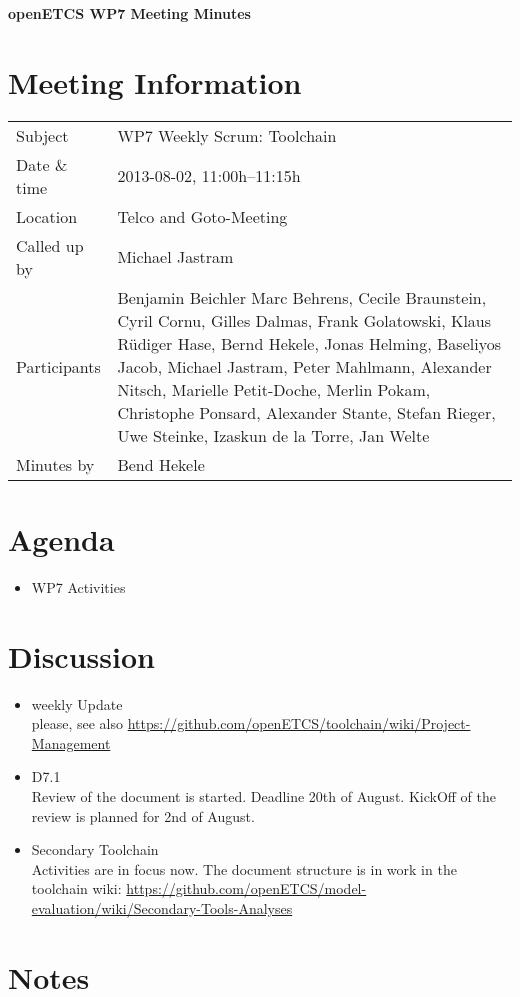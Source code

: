 \documentclass[a4paper, 11pt]{article}
\begin{document}
{\begin{center}\huge\bf openETCS WP7 Meeting Minutes\end{center}}
\section{Meeting Information}

\renewcommand{\arraystretch}{1.5}
\begin{supertabular}{m{.2\textwidth}m{.8\textwidth}}
Subject & WP7 Weekly Scrum: Toolchain\\
Date \& time & 2013-08-02, 11:00h--11:15h\\
Location & Telco and Goto-Meeting\\
Called up by & Michael Jastram\\
Participants &
Benjamin Beichler
Marc Behrens,
Cecile Braunstein,
Cyril Cornu,
Gilles Dalmas,
Frank Golatowski,
Klaus R\"udiger Hase,
Bernd Hekele,
Jonas Helming,
Baseliyos Jacob,
Michael Jastram,
Peter Mahlmann,
Alexander Nitsch,
Marielle Petit-Doche,
Merlin Pokam,
Christophe Ponsard,
Alexander Stante,
Stefan Rieger,
Uwe Steinke,
Izaskun de la Torre,
Jan Welte\\


Minutes by & Bend Hekele\\

\end{supertabular}
\renewcommand{\arraystretch}{1.0}


\section{Agenda}
\begin{itemize}
\item WP7 Activities
\end{itemize}

\section{Discussion}

\begin{itemize}
\item weekly Update\\
please, see also  \url{https://github.com/openETCS/toolchain/wiki/Project-Management}
\item D7.1\\
Review of the document is started. Deadline 20th of August. KickOff of the review is planned for 2nd of August.
\item Secondary Toolchain\\
Activities are in focus now. The document structure is in work in the toolchain wiki:
\url{https://github.com/openETCS/model-evaluation/wiki/Secondary-Tools-Analyses}\\

\end{itemize}

\section{Notes}
\end{document}
